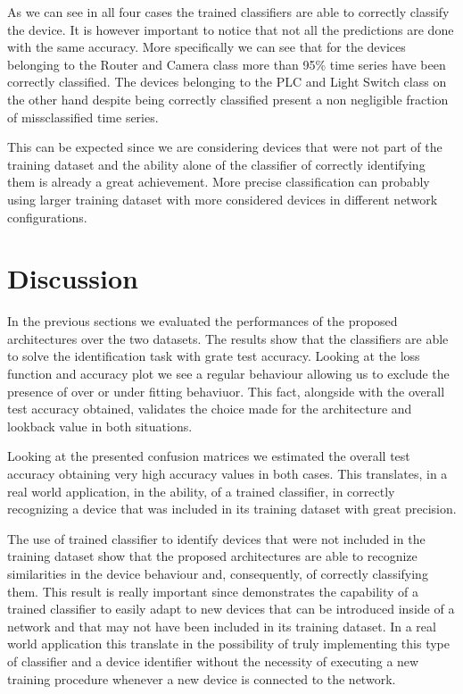As we can see in all four cases the trained classifiers are able to correctly classify the device. It is however important to notice that not all the predictions are done with the same accuracy. More specifically we can see that for the devices belonging to the Router and Camera class more than 95\% time series have been correctly classified. The devices belonging to the PLC and Light Switch class on the other hand despite being correctly classified present a non negligible fraction of missclassified time series.

This can be expected since we are considering devices that were not part of the training dataset and the ability alone of the classifier of correctly identifying them is already a great achievement. More precise classification can probably using larger training dataset with more considered devices in different network configurations.


\section{Discussion}

In the previous sections we evaluated the performances of the proposed architectures over the two datasets. The results show that the classifiers are able to solve the identification task with grate test accuracy. Looking at the loss function and accuracy plot we see a regular behaviour allowing us to exclude the presence of over or under fitting behaviuor. This fact, alongside with the overall test accuracy obtained, validates the choice made for the architecture and lookback value in both situations.

Looking at the presented confusion matrices we estimated the overall test accuracy obtaining very high accuracy values in both cases. This translates, in a real world application, in the ability, of a trained classifier, in correctly recognizing a device that was included in its training dataset with great precision.

The use of trained classifier to identify devices that were not included in the training dataset show that the proposed architectures are able to recognize similarities in the device behaviour and, consequently, of correctly classifying them. This result is really important since demonstrates the capability of a trained classifier to easily adapt to new devices that can be introduced inside of a network and that may not have been included in its training dataset. In a real world application this translate in the possibility of truly implementing this type of classifier and a device identifier without the necessity of executing a new training procedure whenever a new device is connected to the network.